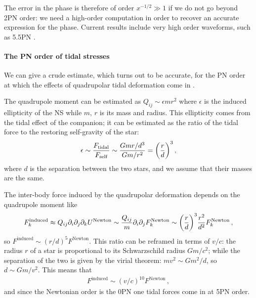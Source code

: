 \documentclass[main.tex]{subfiles}
\begin{document}
The error in the phase is therefore of order \(x^{-1/2} \gg 1\) if we do not go beyond 2PN order: we need a high-order computation in order to recover an accurate expression for the phase. 
Current results include very high order waveforms, such as 5.5PN \cite[]{biniBinaryDynamicsFifth2020}.

\paragraph{The \ac{PN} order of tidal stresses}

We can give a crude estimate, which turns out to be accurate, for the \ac{PN} order at which the effects of quadrupolar tidal deformation come in \cite[pagg.\ 288--289]{maggioreGravitationalWavesVolume2007}. 

The quadrupole moment can be estimated as \(Q_{ij} \sim \epsilon mr^2\) where \(\epsilon \) is the induced ellipticity of the \ac{NS} while \(m\), \(r\) is its mass and radius.
This ellipticity comes from the tidal effect of the companion; it can be estimated as the ratio of the tidal force to the restoring self-gravity of the star: 
%
\begin{align}
\epsilon \sim \frac{F _{\text{tidal}}}{ F _{\text{self}}} \sim \frac{Gm r / d^3}{Gm / r^2} = \qty( \frac{r}{d})^3
\,,
\end{align}
%
where \(d\) is the separation between the two stars, and we assume that their masses are the same. 

The inter-body force induced by the quadrupolar deformation depends on the quadrupole moment like \cite[eqs.\ 5.219, 5.235]{maggioreGravitationalWavesVolume2007}
%
\begin{align}
F ^{\text{induced}}_k \approx Q_{ij} \partial_{i} \partial_{j} \partial_{k} U^{\text{Newton}} \sim \frac{Q_{ij}}{m} \partial_{i} \partial_{j} F^{\text{Newton}}_k \sim \qty( \frac{r}{d})^3 \frac{r^2}{d^2} F^{\text{Newton}}_k
\,,
\end{align}
%
so \(F^{\text{induced}} \sim (r/d)^{5} F^{\text{Newton}}\). 
This ratio can be reframed in terms of \(v/c\): the radius \(r\) of a star is proportional to its Schwarzschild radius \(Gm/c^2\); while the separation of the two is given by the virial theorem: \(m v^2 \sim Gm^2 /d\), so \(d \sim Gm / v^2\). This means that 
%
\begin{align}
F^{\text{induced}} \sim (v/c)^{10} F^{\text{Newton}}
\,,
\end{align}
%
and since the Newtonian order is the 0PN one tidal forces come in at 5PN order. 
\end{document}
